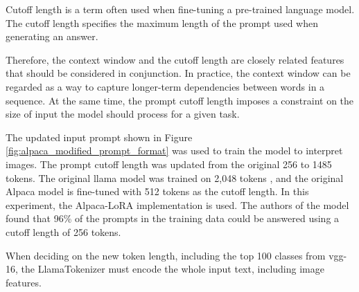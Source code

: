         Cutoff length is a term often used when fine-tuning a pre-trained language model. The cutoff length specifies the maximum length of the prompt used when generating an answer.

        Therefore, the context window and the cutoff length are closely related features that should be considered in conjunction. In practice, the context window can be regarded as a way to capture longer-term dependencies between words in a sequence. At the same time, the prompt cutoff length imposes a constraint on the size of input the model should process for a given task.
        

        The updated input prompt shown in Figure \ref{fig:alpaca_modified_prompt_format} was used to train the model to interpret images. The prompt cutoff length was updated from the original 256 to 1485 tokens. The original \gls{llama} model was trained on 2,048 tokens \cite{SequenceContextLength}, and the original Alpaca model is fine-tuned with 512 tokens as the cutoff length.
        In this experiment, the Alpaca-LoRA implementation is used. The authors of the model found that 96\% of the prompts in the training data could be answered using a cutoff length of 256 tokens.
        
        When deciding on the new token length, including the top 100 classes from \gls{vgg}-16, the LlamaTokenizer must encode the whole input text, including image features.  
        
